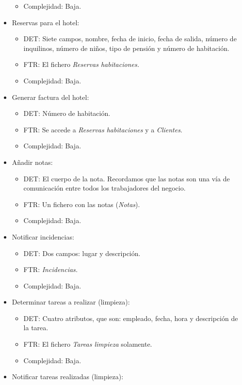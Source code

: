 \documentclass[spanish,a4paper,11pt, twoside]{report}	%
\begin{document}
\begin{itemize}
\begin{itemize}
			\item{Complejidad:} Baja.
		\end{itemize}
		\item{Reservas para el hotel:} 
		\begin{itemize}
 			\item{DET:} Siete campos, nombre, fecha de inicio, fecha de salida, número de inquilinos, número de niños, tipo de pensión y número de habitación.
			\item{FTR:} El fichero \textit{Reservas habitaciones.}
			\item{Complejidad:} Baja.	
		\end{itemize}		
		\item{Generar factura del hotel:} 
		\begin{itemize}
 			\item{DET:} Número de habitación.
			\item{FTR:} Se accede a \textit{Reservas habitaciones} y a \textit{Clientes}.
			\item{Complejidad:} Baja.
		\end{itemize}
		\item{Añadir notas:} 
		\begin{itemize}
 			\item{DET:} El cuerpo de la nota. Recordamos que las notas son una vía de comunicación entre todos los trabajadores del negocio.
			\item{FTR:} Un fichero con las notas (\textit{Notas}).
			\item{Complejidad:} Baja.
		\end{itemize}
		\item{Notificar incidencias:} 
		\begin{itemize}
 			\item{DET:} Dos campos: lugar y descripción.
			\item{FTR:} \textit{Incidencias.}
			\item{Complejidad:} Baja.
		\end{itemize}
		\item{Determinar tareas a realizar (limpieza):} 
		\begin{itemize}
 			\item{DET:} Cuatro atributos, que son: empleado, fecha, hora y descripción de la tarea.
			\item{FTR:} El fichero \textit{Tareas limpieza} solamente.
			\item{Complejidad:} Baja.
		\end{itemize}
		\item{Notificar tareas realizadas (limpieza):} 

\end{itemize}
\end{document}
